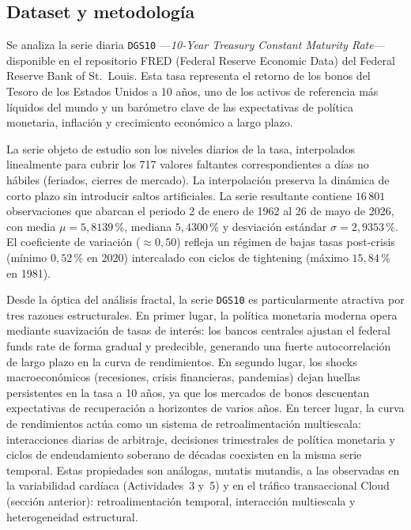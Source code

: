 
\subsection{Dataset y metodología}

Se analiza la serie diaria \texttt{DGS10} —\textit{10-Year Treasury Constant
Maturity Rate}— disponible en el repositorio FRED (Federal Reserve Economic
Data) del Federal Reserve Bank of St.\ Louis. Esta tasa representa el retorno
 de los bonos del Tesoro de los Estados Unidos a 10 años, uno de los activos
 de referencia más líquidos del mundo y un barómetro clave de las
 expectativas de política monetaria, inflación y crecimiento económico a largo
 plazo.

La serie objeto de estudio son los niveles diarios de la tasa, interpolados
linealmente para cubrir los 717 valores faltantes correspondientes a días
no hábiles (feriados, cierres de mercado). La interpolación preserva la
dinámica de corto plazo sin introducir saltos artificiales. La serie
resultante contiene $16\,801$ observaciones que abarcan el periodo
2 de enero de 1962 al 26 de mayo de 2026, con media
$\mu = 5{,}8139\,\%$, mediana $5{,}4300\,\%$ y desviación estándar
$\sigma = 2{,}9353\,\%$. El coeficiente de variación ($\approx 0{,}50$)
refleja un régimen de bajas tasas post-crisis (mínimo $0{,}52\,\%$ en 2020)
intercalado con ciclos de tightening (máximo $15{,}84\,\%$ en 1981).

Desde la óptica del análisis fractal, la serie \texttt{DGS10} es
particularmente atractiva por tres razones estructurales. En primer lugar,
la política monetaria moderna opera mediante suavización de tasas de
interés: los bancos centrales ajustan el 
federal funds rate de forma
gradual y predecible, generando una fuerte autocorrelación de largo plazo
en la curva de rendimientos. En segundo lugar, los shocks macroeconómicos
(recesiones, crisis financieras, pandemias) dejan huellas persistentes en
la tasa a 10 años, ya que los mercados de bonos descuentan expectativas de
recuperación a horizontes de varios años. En tercer lugar, la curva de
rendimientos actúa como un sistema de retroalimentación multiescala:
interacciones diarias de arbitraje, decisiones trimestrales de política
monetaria y ciclos de endeudamiento soberano de décadas coexisten en la
misma serie temporal. Estas propiedades son análogas, mutatis mutandis, a
las observadas en la variabilidad cardíaca (Actividades~3 y~5) y en el
tráfico transaccional Cloud (sección anterior): retroalimentación temporal,
interacción multiescala y heterogeneidad estructural.

